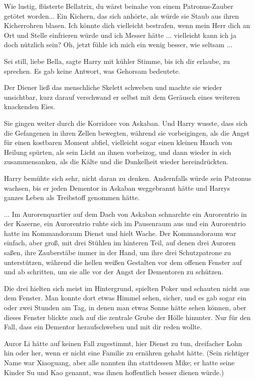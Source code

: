 \glqq{}Wie lustig\grqq{}, flüsterte Bellatrix, \glqq{}du wärst beinahe von einem
Patronus-Zauber getötet worden...\grqq{} Ein Kichern, das sich anhörte, als
würde sie Staub aus ihren Kicherrohren blasen. \glqq{}Ich könnte dich vielleicht
bestrafen, wenn mein Herr dich an Ort und Stelle einfrieren würde und ich Messer
hätte ... vielleicht kann ich ja doch nützlich sein? Oh, jetzt fühle ich mich
ein wenig besser, wie seltsam ...\grqq{}

\glqq{}Sei still, liebe Bella\grqq{}, sagte Harry mit kühler Stimme, \glqq{}bis
ich dir erlaube, zu sprechen.\grqq{} Es gab keine Antwort, was Gehorsam bedeutete.

Der Diener ließ das menschliche Skelett schweben und machte sie wieder
unsichtbar, kurz darauf verschwand er selbst mit dem Geräusch eines weiteren
knackenden Eies.

Sie gingen weiter durch die Korridore von Askaban. Und Harry wusste, dass sich
die Gefangenen in ihren Zellen bewegten, während sie vorbeigingen, als die Angst
für einen kostbaren Moment abfiel, vielleicht sogar einen kleinen Hauch von
Heilung spürten, als sein Licht an ihnen vorbeizog, und dann wieder in sich
zusammensanken, als die Kälte und die Dunkelheit wieder hereindrückten.

Harry bemühte sich sehr, nicht daran zu denken. Andernfalls würde sein Patronus
wachsen, bis er jeden Dementor in Askaban weggebrannt hätte und Harrys ganzes
Leben als Treibstoff genommen hätte.

... Im Aurorenquartier auf dem Dach von Askaban schnarchte ein Aurorentrio in
der Kaserne, ein Aurorentrio ruhte sich im Pausenraum aus und ein Aurorentrio
hatte im Kommandoraum Dienst und hielt Wache. Der Kommandoraum war einfach, aber
groß, mit drei Stühlen im hinteren Teil, auf denen drei Auroren saßen, ihre
Zauberstäbe immer in der Hand, um ihre drei Schutzpatrone zu unterstützen,
während die hellen weißen Gestalten vor dem offenen Fenster auf und ab
schritten, um sie alle vor der Angst der Dementoren zu schützen.

Die drei hielten sich meist im Hintergrund, spielten Poker und schauten nicht
aus dem Fenster. Man konnte dort etwas Himmel sehen, sicher, und es gab sogar
ein oder zwei Stunden am Tag, in denen man etwas Sonne hätte sehen können, aber
dieses Fenster blickte auch auf die zentrale Grube der Hölle hinunter. Nur für
den Fall, dass ein Dementor heraufschweben und mit dir reden wollte.

Auror Li hätte auf keinen Fall zugestimmt, hier Dienst zu tun, dreifacher Lohn
hin oder her, wenn er nicht eine Familie zu ernähren gehabt hätte. (Sein
richtiger Name war Xiaoguang, aber alle nannten ihn stattdessen Mike; er hatte
seine Kinder Su und Kao genannt, was ihnen hoffentlich besser dienen würde.)

